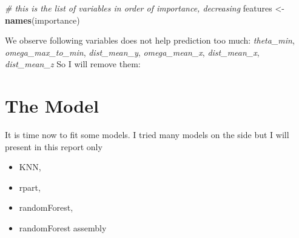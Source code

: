 \documentclass[]{article}
\newenvironment{Shaded}{\begin{snugshade}}{\end{snugshade}}
\newcommand{\CommentTok}[1]{\textcolor[rgb]{0.56,0.35,0.01}{\textit{#1}}}
\newcommand{\KeywordTok}[1]{\textcolor[rgb]{0.13,0.29,0.53}{\textbf{#1}}}
\newcommand{\NormalTok}[1]{#1}
\newcommand{\OperatorTok}[1]{\textcolor[rgb]{0.81,0.36,0.00}{\textbf{#1}}}
\newcommand{\StringTok}[1]{\textcolor[rgb]{0.31,0.60,0.02}{#1}}
\providecommand{\tightlist}{%
  \setlength{\itemsep}{0pt}\setlength{\parskip}{0pt}}
\begin{document}
\begin{Shaded}
\begin{Highlighting}[]
\CommentTok{# this is the list of variables in order of importance, decreasing}
\NormalTok{features <-}\StringTok{ }\KeywordTok{names}\NormalTok{(importance)}
\end{Highlighting}
\end{Shaded}

We observe following variables does not help prediction too much:
\emph{theta\_min}, \emph{omega\_max\_to\_min}, \emph{dist\_mean\_y},
\emph{omega\_mean\_x}, \emph{dist\_mean\_x}, \emph{dist\_mean\_z} So I
will remove them:

\begin{Shaded}
\end{Shaded}

\hypertarget{the-model}{%
\section{The Model}\label{the-model}}

It is time now to fit some models. I tried many models on the side but I
will present in this report only

\begin{itemize}
\tightlist
\item
  KNN,
\item
  rpart,
\item
  randomForest,
\item
  randomForest assembly
\end{itemize}
\end{document}
